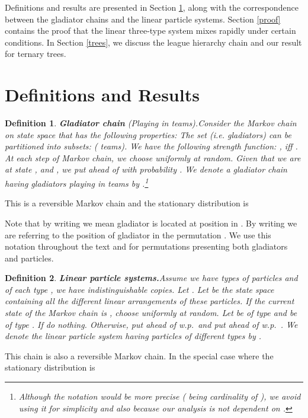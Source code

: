 \documentclass[10 pt]{article}
\newtheorem{defin}{Definition}[section]
\begin{document}
\medskip
Definitions and results are presented in Section \ref{Section1}, along with the correspondence between the gladiator chains and the
linear particle systems. Section \ref{proof} contains the proof that the linear three-type system mixes rapidly under certain conditions.
In Section \ref{trees}, we discuss the league hierarchy chain and our result for ternary trees.  

\section{Definitions and Results}\label{Section1}



\begin{defin}\textbf{Gladiator chain} (Playing in teams).\label{defteams}
Consider the Markov chain  on state space  that has the following properties: The set   (i.e. gladiators)  can be  partitioned
into subsets:  ( teams). We have the following strength function: ,  iff .
At each step of Markov chain,  we choose  uniformly at random. Given that we are at state , and , we put  ahead of  with probability .  We denote a gladiator chain having  gladiators
playing in  teams by .\footnote{Although the notation  would be more precise ( being cardinality
of ), we avoid using it for simplicity and also because our analysis is not dependent on .}

\end{defin}


This is a reversible Markov chain and the stationary distribution  is
\label{stationary}


Note that by writing  we mean gladiator  is located at position  in . By writing 
 we are referring to the position of gladiator  in the permutation . We use this notation throughout the text
and for permutations presenting both gladiators and particles. 


\begin{defin}\textbf{Linear particle systems.}\label{defparts}
Assume we have  types of particles and of each type , we have  indistinguishable copies. Let . 
Let  be the state space containing all the different linear arrangements of these  particles. 
If the current state of the Markov chain is , choose  uniformly at random.  Let  be of type 
and  be of type . If  do nothing. Otherwise, put  ahead of  w.p.\  and
put  ahead of  w.p.\ .  We denote the linear particle system having  particles of
 different types by .
\end{defin}
This chain  is also a reversible Markov chain. In the special case where   the stationary distribution  is
\label{eq2}
\end{document}
